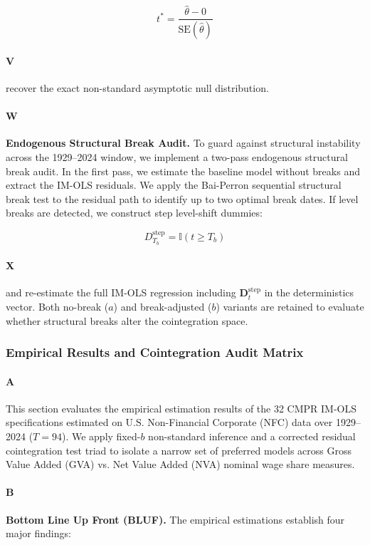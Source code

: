 \[t^* = \frac{\hat{\theta} - 0}{\text{SE}(\hat{\theta})}\]

\paragraph{V}
recover the exact non-standard asymptotic null distribution.

\paragraph{W}
\textbf{Endogenous Structural Break Audit.} To guard against structural instability across the 1929–2024 window, we implement a two-pass endogenous structural break audit. In the first pass, we estimate the baseline model without breaks and extract the IM-OLS residuals. We apply the Bai-Perron sequential structural break test to the residual path to identify up to two optimal break dates. If level breaks are detected, we construct step level-shift dummies:

\[D_{T_b}^{\text{step}} = \mathbb{I}(t \ge T_b)\]

\paragraph{X}
and re-estimate the full IM-OLS regression including $\mathbf{D}_t^{\text{step}}$ in the deterministics vector. Both no-break ($a$) and break-adjusted ($b$) variants are retained to evaluate whether structural breaks alter the cointegration space.

\subsubsection{Empirical Results and Cointegration Audit Matrix}

\paragraph{A}
This section evaluates the empirical estimation results of the 32 CMPR IM-OLS specifications estimated on U.S. Non-Financial Corporate (NFC) data over 1929–2024 ($T = 94$). We apply fixed-$b$ non-standard inference and a corrected residual cointegration test triad to isolate a narrow set of preferred models across Gross Value Added (GVA) vs. Net Value Added (NVA) nominal wage share measures.

\paragraph{B}
\textbf{Bottom Line Up Front (BLUF).} The empirical estimations establish four major findings:

